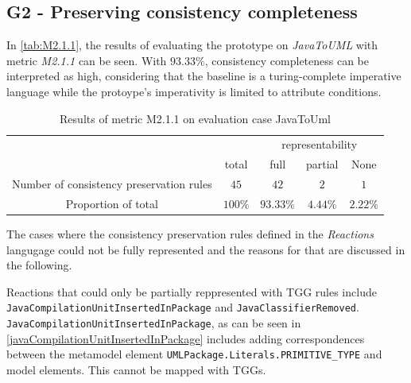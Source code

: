 \subsection{G2 - Preserving consistency completeness}
\label{sec:Evaluation:Results:G2}
In \autoref{tab:M2.1.1}, the results of evaluating the prototype on \emph{JavaToUML} with metric \emph{M2.1.1} can be seen.
With  $93.33\%$, consistency completeness can be interpreted as high, considering that the baseline is a turing-complete imperative language while the protoype's imperativity is limited to attribute conditions.

\begin{table}[h!]
\centering
\begin{tabular}{c | c  c c c}
    \toprule
     &      & \multicolumn{3}{c}{representability} \\
            & total & full & partial & None \\
    \midrule
    Number of consistency preservation rules  & $45$ & $42$ & $2$ & $1$\\
    Proportion of total    & $100\%$ & $93.33\%$ & $4.44\%$ & $2.22\%$ \\
    \bottomrule
\end{tabular}
\caption{Results of metric M2.1.1 on evaluation case JavaToUml}
\label{tab:M2.1.1}
\end{table}

The cases where the consistency preservation rules defined in the \emph{Reactions} langugage could not be fully represented and the reasons for that are discussed in the following.

Reactions that could only be partially reppresented with TGG rules include \newline\texttt{JavaCompilationUnitInsertedInPackage} and \texttt{JavaClassifierRemoved}.
\newline\texttt{JavaCompilationUnitInsertedInPackage}, as can be seen in \autoref{javaCompilationUnitInsertedInPackage} includes adding correspondences between the metamodel element \texttt{UMLPackage.Literals.PRIMITIVE\_TYPE} and model elements. This cannot be mapped with TGGs.


